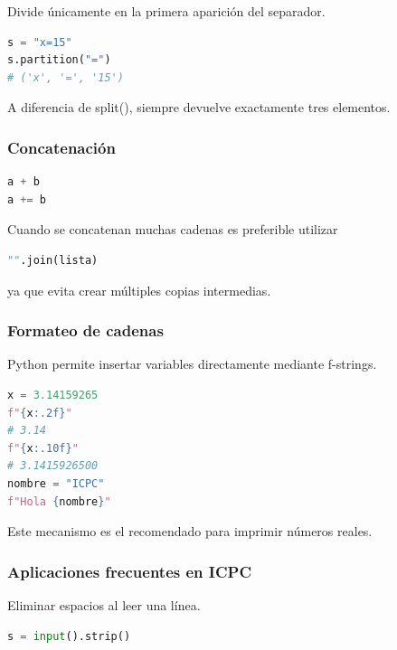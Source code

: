 Divide únicamente en la primera aparición del separador.

\begin{lstlisting}[language=Python]
s = "x=15"
s.partition("=")
# ('x', '=', '15')
\end{lstlisting}

A diferencia de split(), siempre devuelve exactamente tres elementos.

\vspace{0.3cm}

\subsubsection{Concatenación}

\begin{lstlisting}[language=Python]
a + b
a += b
\end{lstlisting}

Cuando se concatenan muchas cadenas es preferible utilizar

\begin{lstlisting}[language=Python]
"".join(lista)
\end{lstlisting}

ya que evita crear múltiples copias intermedias.

\vspace{0.3cm}

\subsubsection{Formateo de cadenas}

Python permite insertar variables directamente mediante f-strings.

\begin{lstlisting}[language=Python]
x = 3.14159265
f"{x:.2f}"
# 3.14
f"{x:.10f}"
# 3.1415926500
nombre = "ICPC"
f"Hola {nombre}"
\end{lstlisting}

Este mecanismo es el recomendado para imprimir números reales.

\vspace{0.3cm}

\subsubsection{Aplicaciones frecuentes en ICPC}

Eliminar espacios al leer una línea.

\begin{lstlisting}[language=Python]
s = input().strip()
\end{lstlisting}

